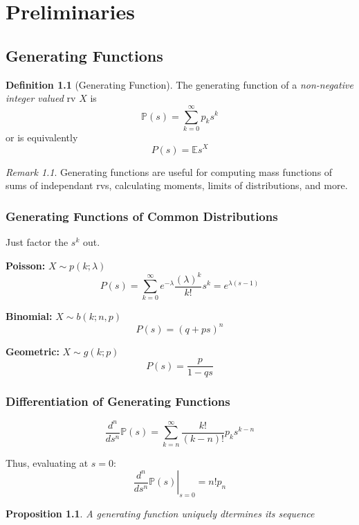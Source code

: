 \documentclass[a4paper]{report}
\author{Sidney I. Resnick}
\title{\ntitle}
\date{}
\newtheorem{proposition}[chapter]{Proposition}
\theoremstyle{definition}
\newtheorem{definition}{Definition}[chapter]
\theoremstyle{remark}
\newtheorem*{remark}{Remark}
\begin{document}
\maketitle
\tableofcontents
\newpage

\chapter{Preliminaries}

\section{Generating Functions}
\begin{definition}[Generating Function]
\label{Generating Function}
The generating function of a \textit{non-negative integer valued} rv $X$ is \[ \mathbb{P}(s) = \sum_{k=0}^{\infty}p_{k}s^{k} \] or is equivalently
\[
P(s) = \mathbb{E}s^{X}
\]
\end{definition}

\begin{remark} 
Generating functions are useful for computing mass functions of sums of independant rvs, calculating moments, limits of distributions, and more.
\end{remark}

\subsection{Generating Functions of Common Distributions}
Just factor the $s^{k}$ out.

\textbf{Poisson:} $X \sim p(k; \lambda) $
\[
  P(s) = \sum_{k=0}^{\infty} e^{-\lambda} \frac{(\lambda)^{k}}{k!} s^{k} = e^{\lambda(s-1)}
\]

\textbf{Binomial:} $X \sim b(k; n, p) $
\[
P(s) = (q + ps)^{n}
\]

\textbf{Geometric:} $X \sim g(k; p)$
\[
P(s) = \frac{p}{1 - qs}
\]

\subsection{Differentiation of Generating Functions}
\[
\frac{d^{ n }}{ds^{ n }} \mathbb{P}(s) = \sum_{k=n}^{\infty} \frac{k!}{(k-n)!} p_{k} s^{k-n}
\]

Thus, evaluating at $s=0$:
\[
\left. \frac{d^{ n }}{ds^{ n }} \mathbb{P}(s) \right|_{s=0}= n!p_{n}
\]
\begin{proposition}
A generating function uniquely dtermines its sequence
\end{proposition}
\end{document}
